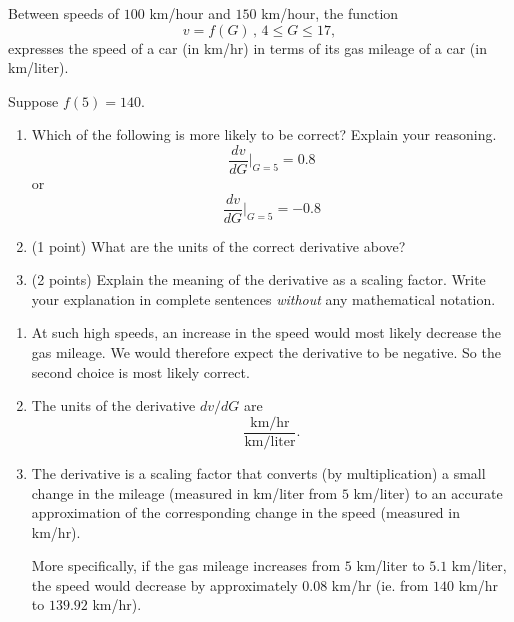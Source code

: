 \documentclass{ximera}
\begin{document}
\begin{question} \label{Qpdff3}
Between speeds of $100$ km/hour and $150$ km/hour, the function
\[
  v = f(G) \, , \, 4 \leq  G \leq 17,
\]
expresses the speed of a car (in km/hr) in terms of its gas mileage of a car (in km/liter).

Suppose $f(5)= 140$.

\begin{enumerate}
\item Which of the following is more likely to be correct? Explain your reasoning.
\[
    \frac{dv}{dG}\Big|_{G=5} = 0.8
\]
or 
\[
   \frac{dv}{dG}\Big|_{G=5} =-0.8
\]

\item (1 point) What are the units of the correct derivative above?


\item (2 points) Explain the meaning of the derivative as a scaling factor. Write your explanation in complete sentences \emph{without} any mathematical notation.

\end{enumerate}


\begin{explanation}
\begin{enumerate}
\item At such high speeds, an increase in the speed would most likely decrease the gas mileage. We would therefore expect the derivative to be negative. So the second choice is most likely correct.

\item The units of the derivative $dv/dG$ are
\[
        \frac{\text{km/hr}}{\text{km/liter}} .
\] 

\item The derivative is a scaling factor that converts (by multiplication) a small change in the mileage (measured in km/liter from $5$ km/liter) to an accurate approximation of the corresponding change in the speed (measured in km/hr).

More specifically, if the gas mileage increases from $5$ km/liter to $5.1$ km/liter, the speed would decrease by approximately $0.08$  km/hr (ie. from $140$ km/hr to $139.92$ km/hr).

\end{enumerate}
\end{explanation}
\end{question}
\end{document}
